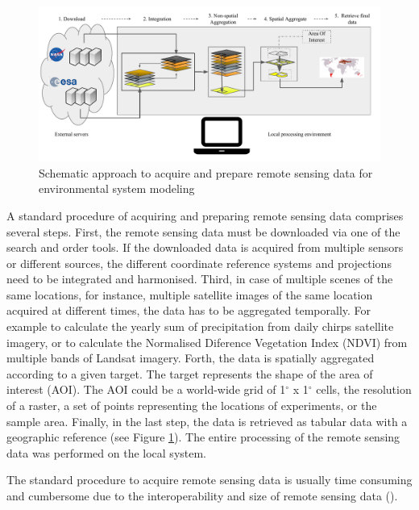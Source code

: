 \begin{center}
	\begin{figure}[h]
		\begin{center}
			\includegraphics[width=15cm]{images/traditional_acquisition-cropped.pdf}
			\caption{Schematic approach to acquire and prepare remote sensing data for environmental system modeling}
			\label{traditionl_approach}
		\end{center}
	\end{figure}
\end{center}


A standard procedure of acquiring and preparing remote sensing data comprises several steps. First, the remote sensing data must be downloaded via one of the search and order tools. If the downloaded data is acquired from multiple sensors or different sources, the different coordinate reference systems and projections need to be integrated and harmonised. Third, in case of multiple scenes of the same locations, for instance, multiple satellite images of the same location acquired at different times, the data has to be aggregated temporally. For example to calculate the yearly sum of precipitation from daily chirps satellite imagery, or to calculate the Normalised Diference Vegetation Index (NDVI) from multiple bands of Landsat imagery.
Forth, the data is spatially aggregated according to a given target. The target represents the shape of the area of interest (AOI). The AOI could be a world-wide grid of 1$^\circ$ x 1$^\circ$ cells, the resolution of a raster, a set of points representing the locations of experiments, or the sample area. Finally, in the last step, the data is retrieved as tabular data with a geographic reference (see Figure \ref{traditionl_approach}). The entire processing of the remote sensing data was performed on the local system.

The standard procedure to acquire remote sensing data is usually time consuming and cumbersome due to the interoperability and size of remote sensing data (\cite{iosifescu2011geovite}).

